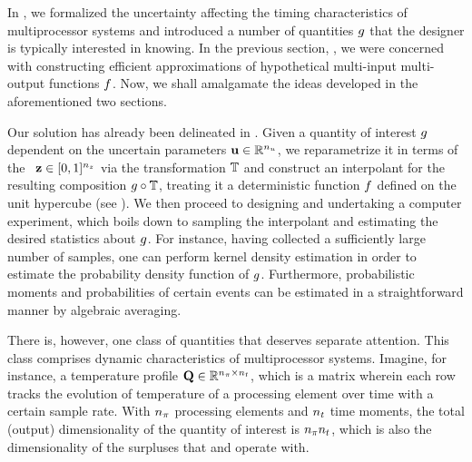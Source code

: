 In , we formalized the uncertainty affecting the timing
characteristics of multiprocessor systems and introduced a number of quantities
$g$ that the designer is typically interested in knowing. In the previous
section, , we were concerned with constructing efficient
approximations of hypothetical multi-input multi-output functions $f$. Now, we
shall amalgamate the ideas developed in the aforementioned two sections.

Our solution has already been delineated in . Given a quantity of
interest $g$ dependent on the uncertain parameters $\mathbf{u} \in \mathbb{R}^{n_u}$, we
reparametrize it in terms of the \rvs\ $\mathbf{z} \in [0, 1]^{n_z}$ via the
transformation $\mathbb{T}$ and construct an interpolant for the resulting
composition $g \circ \mathbb{T}$, treating it a deterministic function
$f$ defined on the unit hypercube (see ). We then
proceed to designing and undertaking a computer experiment, which boils down to
sampling the interpolant and estimating the desired statistics about $g$. For
instance, having collected a sufficiently large number of samples, one can
perform kernel density estimation in order to estimate the probability density
function of $g$. Furthermore, probabilistic moments and probabilities of
certain events can be estimated in a straightforward manner by algebraic
averaging.

There is, however, one class of quantities that deserves separate attention.
This class comprises dynamic characteristics of multiprocessor systems. Imagine,
for instance, a temperature profile $\mathbf{Q} \in \mathbb{R}^{{n_\pi} \times {n_t}}$, which is a
matrix wherein each row tracks the evolution of temperature of a processing
element over time with a certain sample rate. With ${n_\pi}$ processing elements and
${n_t}$ time moments, the total (output) dimensionality of the quantity of
interest is ${n_\pi}{n_t}$, which is also the dimensionality of the surpluses that
 and  operate with.
